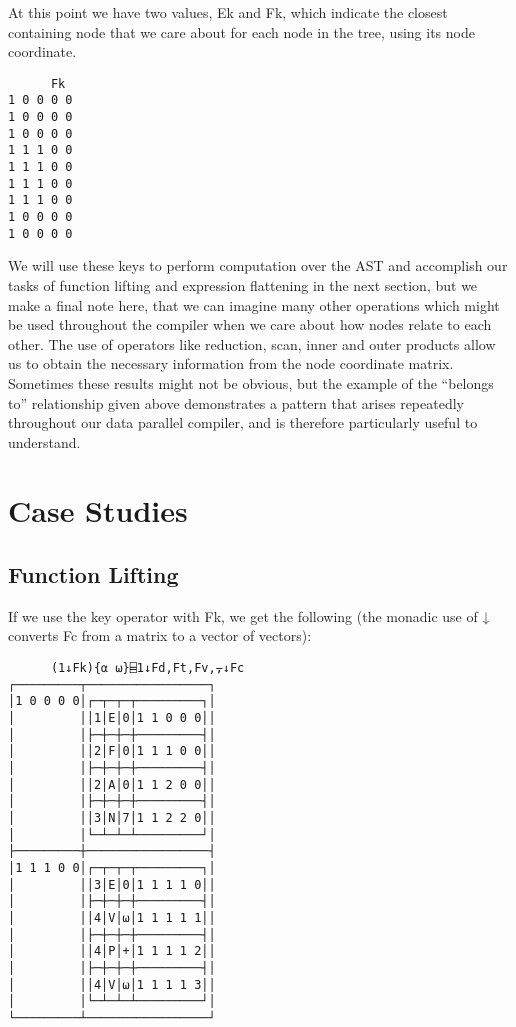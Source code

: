 \documentclass[pldi]{sigplanconf-pldi15}
\begin{document}
At this point we have two values, Ek and Fk, which indicate the closest containing node that we care about 
for each node in the tree, using its node coordinate. 

\begin{verbatim}
      Fk
1 0 0 0 0
1 0 0 0 0
1 0 0 0 0
1 1 1 0 0
1 1 1 0 0
1 1 1 0 0
1 1 1 0 0
1 0 0 0 0
1 0 0 0 0
\end{verbatim}

We will use these keys to perform computation over the AST and accomplish our tasks of function lifting and 
expression flattening in the next section, but we make a final note here, that we can imagine many other 
operations which might be used throughout the compiler when we care about how nodes relate to each 
other. The use of operators like reduction, scan, inner and outer products allow us to obtain the necessary 
information from the node coordinate matrix. Sometimes these results might not be obvious, but the 
example of the “belongs to” relationship given above demonstrates a pattern that arises repeatedly 
throughout our data parallel compiler, and is therefore particularly useful to understand. 

\section{Case Studies}

\subsection{Function Lifting}

If we use the key operator with Fk, we get the following (the monadic use of ↓ converts Fc from a 
matrix to a vector of vectors):

\begin{verbatim}
      (1↓Fk){⍺ ⍵}⌸1↓Fd,Ft,Fv,⍪↓Fc
┌─────────┬─────────────────┐
│1 0 0 0 0│┌─┬─┬─┬─────────┐│
│         ││1│E│0│1 1 0 0 0││
│         │├─┼─┼─┼─────────┤│
│         ││2│F│0│1 1 1 0 0││
│         │├─┼─┼─┼─────────┤│
│         ││2│A│0│1 1 2 0 0││
│         │├─┼─┼─┼─────────┤│
│         ││3│N│7│1 1 2 2 0││
│         │└─┴─┴─┴─────────┘│
├─────────┼─────────────────┤
│1 1 1 0 0│┌─┬─┬─┬─────────┐│
│         ││3│E│0│1 1 1 1 0││
│         │├─┼─┼─┼─────────┤│
│         ││4│V│⍵│1 1 1 1 1││
│         │├─┼─┼─┼─────────┤│
│         ││4│P│+│1 1 1 1 2││
│         │├─┼─┼─┼─────────┤│
│         ││4│V│⍵│1 1 1 1 3││
│         │└─┴─┴─┴─────────┘│
└─────────┴─────────────────┘
\end{verbatim}
\end{document}
